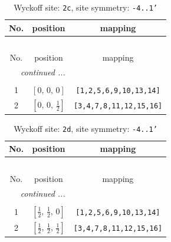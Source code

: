 \documentclass[fleqn,8pt]{jsarticle}
\begin{document}
\renewcommand{\arraystretch}{1.2}
\begin{longtable}{ccc}
\caption{Wyckoff site: {\tt 2c}, site symmetry: {\tt -4..1'}}
 \\
 \hline \hline
No. & position & mapping \\ \hline \endfirsthead

\multicolumn{2}{l}{\tablename\ \thetable{}} \\
 \hline \hline
No. & position & mapping \\ \hline \endhead

 \hline \hline
\multicolumn{2}{r}{\footnotesize\it continued ...} \\ \endfoot

 \hline \hline
\multicolumn{2}{r}{} \\ \endlastfoot

1 & $\left[ 0,\, 0,\, 0 \right]$ & {\tt [1,2,5,6,9,10,13,14]} \\ \hline
2 & $\left[ 0,\, 0,\, \frac{1}{2} \right]$ & {\tt [3,4,7,8,11,12,15,16]} \\
\end{longtable}
\renewcommand{\arraystretch}{1.2}
\begin{longtable}{ccc}
\caption{Wyckoff site: {\tt 2d}, site symmetry: {\tt -4..1'}}
 \\
 \hline \hline
No. & position & mapping \\ \hline \endfirsthead

\multicolumn{2}{l}{\tablename\ \thetable{}} \\
 \hline \hline
No. & position & mapping \\ \hline \endhead

 \hline \hline
\multicolumn{2}{r}{\footnotesize\it continued ...} \\ \endfoot

 \hline \hline
\multicolumn{2}{r}{} \\ \endlastfoot

1 & $\left[ \frac{1}{2},\, \frac{1}{2},\, 0 \right]$ & {\tt [1,2,5,6,9,10,13,14]} \\ \hline
2 & $\left[ \frac{1}{2},\, \frac{1}{2},\, \frac{1}{2} \right]$ & {\tt [3,4,7,8,11,12,15,16]} \\
\end{longtable}
\renewcommand{\arraystretch}{1.2}
\end{document}
